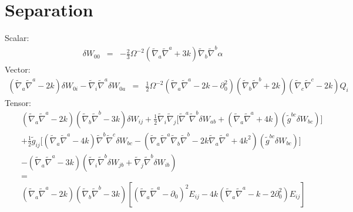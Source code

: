 \documentclass[10pt,letterpaper]{article}
\numberwithin{equation}{section}
\begin{document}
\section{Separation}
%
%
Scalar:
\begin{eqnarray}
\delta W_{00}&=& - \tfrac{2}{3} \Omega^{-2} (\tilde\nabla_a\tilde\nabla^a + 3k)\tilde\nabla_b\tilde\nabla^b \alpha
\end{eqnarray}
Vector:
\begin{eqnarray}
(\tilde\nabla_a\tilde\nabla^a-2k)\delta W_{0i} - \tilde\nabla_i \tilde\nabla^a \delta W_{0a} &=&
\tfrac12 \Omega^{-2} (\tilde\nabla_a\tilde\nabla^a - 2k - \partial_0^2)(\tilde\nabla_b\tilde\nabla^b + 2k)(\tilde\nabla_c\tilde\nabla^c -2k)Q_i
\end{eqnarray}
Tensor:
\begin{eqnarray}
&&(\tilde\nabla_a\tilde\nabla^a-2k)(\tilde\nabla_b\tilde\nabla^b-3k)\delta W_{ij}
+ \tfrac12 \tilde\nabla_i\tilde\nabla_j\big[ \tilde\nabla^a\tilde\nabla^b \delta W_{ab} + (\tilde\nabla_a\tilde\nabla^a +4k)(\tilde g^{bc}\delta W_{bc})\big]
\nonumber\\
&&
+\tfrac12 \tilde g_{ij} \big[ (\tilde\nabla_a\tilde\nabla^a-4k)\tilde\nabla^b\tilde\nabla^c \delta W_{bc}-(\tilde\nabla_a\tilde\nabla^a\tilde\nabla_b\tilde\nabla^b -2k \tilde\nabla_a\tilde\nabla^a +4k^2)(\tilde g^{bc}\delta W_{bc})\big]
\nonumber\\
&&
-(\tilde\nabla_a\tilde\nabla^a -3k)(\tilde\nabla_i\tilde\nabla^b \delta W_{jb} + \tilde\nabla_j \tilde\nabla^b \delta W_{ib})
\nonumber\\
&&=
\nonumber\\
&&(\tilde\nabla_a\tilde\nabla^a-2k)(\tilde\nabla_b\tilde\nabla^b-3k)\left[ (\tilde\nabla_a\tilde\nabla^a-\partial_0)^2 E_{ij} - 4k (\tilde\nabla_a\tilde\nabla^a - k-2\partial_0^2)E_{ij} \right]
\end{eqnarray}
\end{document}
